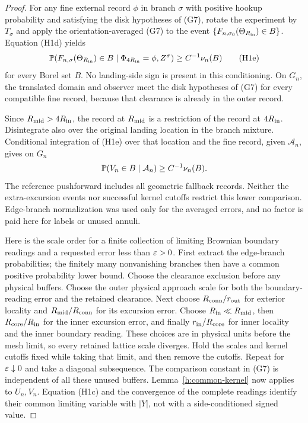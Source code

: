 \begin{proof}
For any fine external record $\phi$ in branch $\sigma$ with positive
hookup probability and satisfying the disk hypotheses of (G7), rotate
the experiment by $T_\sigma$ and apply the orientation-averaged (G7)
to the event
$\{F_{n,\sigma_0}(\Theta_{R_{\rm in}})\in B\}$. Equation (H1d) yields
\[
 \mathbb P(F_{n,\sigma}(\Theta_{R_{\rm in}})\in B
       \mid\Phi_{4R_{\rm in}}=\phi,Z^\sigma)
       \ge C^{-1}\nu_n(B)                                \tag{H1e}
\]
for every Borel set $B$. No landing-side sign is present in this
conditioning. On $G_n$, the translated domain and observer meet the
disk hypotheses of (G7) for every compatible fine record, because
that clearance is already in the outer record.

Since $R_{\rm mid}>4R_{\rm in}$, the record at $R_{\rm mid}$ is a
restriction of the record at $4R_{\rm in}$. Disintegrate also over the
original landing location in the branch mixture. Conditional
integration of (H1e) over that location and the fine record, given
$\mathcal A_n$, gives on $G_n$
\[
 \mathbb P(V_n\in B\mid\mathcal A_n)\ge C^{-1}\nu_n(B).
\]
The reference pushforward includes all geometric fallback records.
Neither the extra-excursion events nor successful kernel cutoffs
restrict this lower comparison. Edge-branch normalization was used
only for the averaged errors, and no factor is paid here for labels
or unused annuli.

Here is the scale order for a finite collection of limiting Brownian
boundary readings and a requested error less than $\varepsilon>0$.
First extract the edge-branch probabilities; the finitely many
nonvanishing branches then have a common positive probability lower
bound. Choose the clearance exclusion before any physical buffers. Choose the
outer physical approach scale for both the boundary-reading error and
the retained clearance. Next choose $R_{\rm conn}/r_{\rm out}$
for exterior locality and $R_{\rm mid}/R_{\rm conn}$ for its
excursion error. Choose $R_{\rm in}\ll R_{\rm mid}$, then
$R_{\rm core}/R_{\rm in}$ for the inner excursion error, and finally
$r_{\rm in}/R_{\rm core}$ for inner locality and the inner boundary
reading. These choices are in physical units before the mesh limit, so
every retained lattice scale diverges. Hold the scales and kernel
cutoffs fixed while taking that limit, and then remove the cutoffs.
Repeat for $\varepsilon\downarrow0$ and take a diagonal subsequence.
The comparison constant in (G7) is independent of all these unused buffers.
Lemma~\ref{h:common-kernel} now applies to $U_n,V_n$. Equation (H1c)
and the convergence of the complete readings identify their common
limiting variable with $|Y|$, not with a side-conditioned signed value.
\end{proof}

